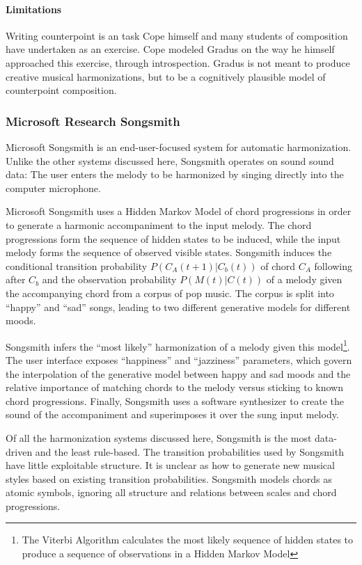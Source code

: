 \paragraph{Limitations} 
Writing counterpoint is an task Cope himself and many students of composition have undertaken as an exercise. Cope modeled Gradus on the way he himself approached this exercise, through introspection. Gradus is not meant to produce creative musical harmonizations, but to be a cognitively plausible model of counterpoint composition.

\subsubsection{Microsoft Research Songsmith}
Microsoft Songsmith \cite{simon2008mysong} is an end-user-focused system for automatic harmonization. Unlike the other systems discussed here, Songsmith operates on sound sound data: The user enters the melody to be harmonized by singing directly into the computer microphone.

Microsoft Songsmith uses a Hidden Markov Model of chord progressions in order to generate a harmonic accompaniment to the input melody. The chord progressions form the sequence of hidden states to be induced, while the input melody forms the sequence of observed visible states. Songsmith induces the conditional transition probability $P(C_A(t+1)|C_b(t))$ of chord $C_A$ following after $C_b$ and the observation probability $P(M(t)|C(t))$ of a melody given the accompanying chord from a corpus of pop music. The corpus is split into ``happy'' and ``sad'' songs, leading to two different generative models for different moods.

Songsmith infers the ``most likely'' harmonization of a melody given this model\footnote{The Viterbi Algorithm calculates the most likely sequence of hidden states to produce a sequence of observations in a Hidden Markov Model}. The user interface exposes ``happiness'' and ``jazziness'' parameters, which govern the interpolation of the generative model between happy and sad moods and the relative importance of matching chords to the melody versus sticking to known chord progressions. Finally, Songsmith uses a software synthesizer to create the sound of the accompaniment and superimposes it over the sung input melody.

Of all the harmonization systems discussed here, Songsmith is the most data-driven and the least rule-based. The transition probabilities used by Songsmith have little exploitable structure. It is unclear as how to generate new musical styles based on existing transition probabilities. Songsmith models chords as atomic symbols, ignoring all structure and relations between scales and chord progressions.

